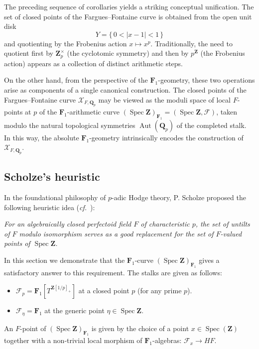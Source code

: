 \documentclass[11pt,a4paper]{article}
\newcommand{\Q}{\mathbf{Q}}
\newcommand{\Z}{\mathbf{Z}}
\newcommand{\Fone}{\mathbf{F}_{1}}
\def\spz{\Spec \Z}
\def\spzf{(\Spec \Z)_{\mathbf{F}_{1}}}
\newcommand{\Spec}{\operatorname{Spec}}
\def\cf{{\it cf.\/}\ }
\begin{document}
The preceding sequence of corollaries yields a striking conceptual unification. 
The set of closed points of the Fargues–Fontaine curve  is obtained  from the open unit disk
\[
Y=\{\,0<|x-1|<1\,\}
\]
and quotienting by the Frobenius action $x\mapsto x^p$. 
Traditionally, the need to quotient first by $\Z_p^\times$ 
(the cyclotomic symmetry) and then by $p^\Z$ 
(the Frobenius action) appears as a collection of distinct arithmetic steps.

On the other hand, from the perspective of the $\Fone$-geometry,  these two operations arise as components of a single canonical construction. 
The closed points of the Fargues–Fontaine curve $\mathcal{X}_{F, \Q_p}$ may be viewed as the moduli space of local $F$-points  at $p$ of the  $\Fone$-arithmetic curve $\spzf=(\spz, \mathcal F)$,
taken modulo the natural topological symmetries 
$\operatorname{Aut}(\Q_p)$ of the completed stalk. 
In this way, the absolute $\Fone$-geometry  intrinsically encodes the construction of $\mathcal{X}_{F,\Q_p}$.



\subsection{Scholze's heuristic}\label{heuristic}

In the foundational philosophy of $p$-adic Hodge theory, P. Scholze proposed the following heuristic idea (\cf \cite[Lecture 1]{Lurie}): \vspace{.05in}

\emph{For an algebraically closed perfectoid field $F$ of characteristic $p$, the set of untilts of $F$ modulo isomorphism serves as a good replacement for the set of $F$-valued points of $\spz$.}\vspace{.05in} 

In this section we demonstrate that the $\Fone$-curve $\spzf$ gives a satisfactory answer to this requirement.  The stalks are given as follows:
\begin{itemize}
    \item $\mathcal{F}_p = \Fone[T^{\Z[1/p]_+}]$ at a closed point $p$ (for any prime $p$).
    \item $\mathcal{F}_\eta = \Fone$ at the generic point $\eta\in \spz$.
\end{itemize}

An $F$-point of $\spzf$ is given by the choice of a  point $x \in \Spec(\Z)$ together with a non-trivial local morphism of $\Fone$-algebras:   $\mathcal{F}_x\to HF$.
\end{document}
